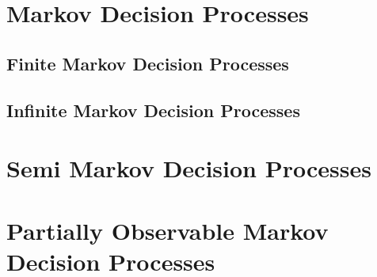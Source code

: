 \section{Markov Decision Processes}
\subsection{Finite Markov Decision Processes}
\subsection{Infinite Markov Decision Processes}

\section{Semi Markov Decision Processes}

\section{Partially Observable Markov Decision Processes}
